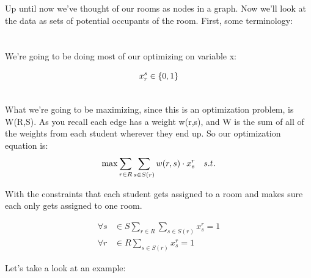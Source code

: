 \documentclass[12pt]{article}
\begin{document}
Up until now we've thought of our rooms as nodes in a graph. Now we'll look at the data as sets of potential occupants of the room. First, some terminology:\\

\\
\\ 

\noindent We're going to be doing most of our optimizing on variable x:

\begin{equation*}
\noindent{x_r^s \in \{0, 1\}\\} 
\end{equation*}


\\

What we're going to be maximizing, since this is an optimization problem, is W(R,S). As you recall each edge has a weight w(r,s), and W is the sum of all of the weights from each student wherever they end up. So our optimization equation is:\\

\begin{equation*}
\max\sum_{r\in{R}}\sum_{s\in{S(r)}}w(r,s)\cdot{x_s^r}\quad{s.t.}\\
\end{equation*}

With the constraints that each student gets assigned to a room and makes sure each only gets assigned to one room.

\begin{align*}
\forall{s}&\in{S}\sum_{r\in{R}}\sum_{s\in{S(r)}}x_s^r=1\\
\forall{r}&\in{R}\sum_{s\in{S(r)}}x_s^r=1
\end{align*}

Let's take a look at an example:\\
\end{document}

